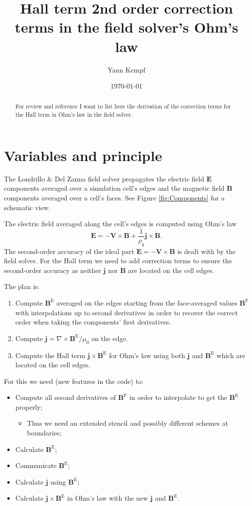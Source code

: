 \documentclass[a4paper,10pt]{article}
\title{Hall term 2nd order correction terms in the field solver's Ohm's law}
\author{Yann Kempf}
\date{\today}
\newcommand{\E}{\mathbf{E}}
\newcommand{\B}{\mathbf{B}}
\newcommand{\Be}{\mathbf{B}^\mathrm{E}}
\newcommand{\Bf}{\mathbf{B}^{\mathrm{F}}}
\newcommand{\J}{\mathbf{j}}
\begin{document}
\maketitle

\begin{abstract}
For review and reference I want to list here the derivation of the correction
terms for the Hall term in Ohm's law in the field solver.
\end{abstract}

\section{Variables and principle}
The Londrillo \& Del Zanna field solver propagates the electric field $\E$
components averaged over a simulation cell's edges and the magnetic field $\B$
components averaged over a cell's faces. See Figure \ref{fig:Components} for a
schematic view.

The electric field averaged along the cell's edges is computed using Ohm's law
\begin{equation}
   \E = -\mathbf{V}\times\B + \frac{1}{\rho_q}\J\times\B.
\end{equation}
The second-order accuracy of the ideal part $\E=-\mathbf{V}\times\B$ is dealt
with by the field solver. For the Hall term we need to add correction terms to
ensure the second-order accuracy as neither $\J$ nor $\B$ are located on the
cell edges.

The plan is:
\begin{enumerate}
   \item Compute $\Be$ averaged on the edges starting from the face-averaged
values $\Bf$ with interpolations up to second derivatives in order to recover
the correct order when taking the components' first derivatives.
   \item Compute $\J=\nabla\times\Be/\mu_0$ on the edge.
   \item Compute the Hall term $\J\times\Be$ for Ohm's law using both $\J$ and
$\Be$ which are located on the cell edges.
\end{enumerate}

For this we need (new features in the code) to:
\begin{itemize}
   \item Compute all second derivatives of $\Bf$ in order to interpolate to
get the $\Be$ properly;
   \begin{itemize}
      \item Thus we need an extended stencil and possibly different schemes at
boundaries;
   \end{itemize}
   \item Calculate $\Be$;
   \item Communicate $\Be$;
   \item Calculate $\J$ using $\Be$;
   \item Calculate $\J\times\Be$ in Ohm's law with the new $\J$ and $\Be$.
\end{itemize}
\end{document}
